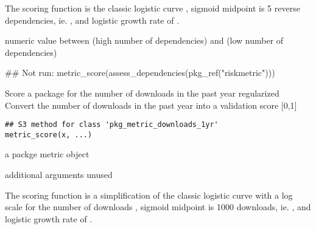 \documentclass[a4paper]{book}
\begin{document}
%
\begin{Details}
The scoring function is the classic logistic curve 
, sigmoid midpoint is 5 reverse dependencies, ie. ,
and logistic growth rate of .

\end{Details}
%
\begin{Value}
numeric value between  (high number of  dependencies) and
 (low number of dependencies)
\end{Value}
%
\begin{Examples}
\begin{ExampleCode}
## Not run: metric_score(assess_dependencies(pkg_ref("riskmetric")))

\end{ExampleCode}
\end{Examples}
%
\begin{Description}
Score a package for the number of downloads in the past year regularized
Convert the number of downloads  in the past year into a validation
score [0,1] 
\end{Description}
%
\begin{Usage}
\begin{verbatim}
## S3 method for class 'pkg_metric_downloads_1yr'
metric_score(x, ...)
\end{verbatim}
\end{Usage}
%
\begin{Arguments}
\begin{ldescription}
\item[\code{x}] a  packge metric object

\item[\code{...}] additional arguments unused
\end{ldescription}
\end{Arguments}
%
\begin{Details}
The scoring function is a simplification of the classic logistic curve  with a log scale for the number of downloads
, sigmoid midpoint is 1000 downloads, ie. , and logistic growth rate of .

\end{Details}
\end{document}
